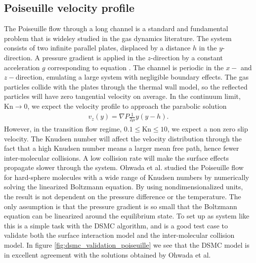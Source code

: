 \subsection{Poiseuille velocity profile}
\label{sec:dsmc_validation_poiseuille}
The Poiseuille flow through a long channel is a standard and fundamental problem that is wideley studied in the gas dynamics literature. The system consists of two infinite parallel plates, displaced by a distance $h$ in the $y$-direction. A pressure gradient is applied in the $z$-direction by a constant acceleration $g$ corresponding to equation . 
The channel is periodic in the $x-$ and $z-$direction, emulating a large system with negligible boundary effects. The gas particles collide with the plates through the thermal wall model, so the reflected particles will have zero tangential velocity on average. In the continuum limit, $\text{Kn}\rightarrow 0$, we expect the velocity profile to approach the parabolic solution \cite{batchelor2000introduction}
\begin{align}
	v_z(y) = \nabla P\frac{1}{2\mu}y(y-h).
\end{align}
However, in the transition flow regime, $0.1 \leq \text{Kn} \leq 10$, we expect a non zero slip velocity\cite{morris1992slip}. The Knudsen number will affect the velocity distribution through the fact that a high Knudsen number means a larger mean free path, hence fewer inter-molecular collisions. A low collision rate will make the surface effects propagate slower through the system. Ohwada et al. \cite{ohwada1989numerical} studied the Poiseuille flow for hard-sphere molecules with a wide range of Knudsen numbers by numerically solving the linearized Boltzmann equation. By using nondimensionalized units, the result is not dependent on the pressure difference or the temperature. The only assumption is that the pressure gradient is so small that the Boltzmann equation can be linearized around the equilibrium state. To set up as system like this is a simple task with the DSMC algorithm, and is a good test case to validate both the surface interaction model and the inter-molecular collision model. In figure \ref{fig:dsmc_validation_poiseuille} we see that the DSMC model is in excellent agreement with the solutions obtained by Ohwada et al. 
